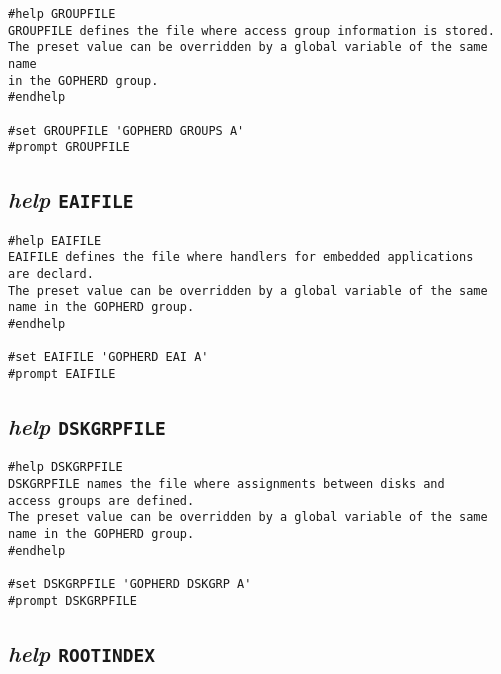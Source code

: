 \def\LPtopD{{\sl{help}} {\tt GROUPFILE}}

\def\LPtopF{~}

\begin{verbatim}
#help GROUPFILE
GROUPFILE defines the file where access group information is stored.
The preset value can be overridden by a global variable of the same name
in the GOPHERD group.
#endhelp

#set GROUPFILE 'GOPHERD GROUPS A'
#prompt GROUPFILE
\end{verbatim}

\subsection{{\sl{help}} {\tt EAIFILE}}

\def\LPtopD{{\sl{help}} {\tt EAIFILE}}

\def\LPtopF{~}

\begin{verbatim}
#help EAIFILE
EAIFILE defines the file where handlers for embedded applications
are declard.
The preset value can be overridden by a global variable of the same
name in the GOPHERD group.
#endhelp

#set EAIFILE 'GOPHERD EAI A'
#prompt EAIFILE
\end{verbatim}

\subsection{{\sl{help}} {\tt DSKGRPFILE}}

\def\LPtopD{{\sl{help}} {\tt DSKGRPFILE}}

\def\LPtopF{~}

\begin{verbatim}
#help DSKGRPFILE
DSKGRPFILE names the file where assignments between disks and
access groups are defined.
The preset value can be overridden by a global variable of the same
name in the GOPHERD group.
#endhelp

#set DSKGRPFILE 'GOPHERD DSKGRP A'
#prompt DSKGRPFILE
\end{verbatim}

\subsection{{\sl{help}} {\tt ROOTINDEX}}

\def\LPtopD{{\sl{help}} {\tt ROOTINDEX}}

\def\LPtopF{~}

